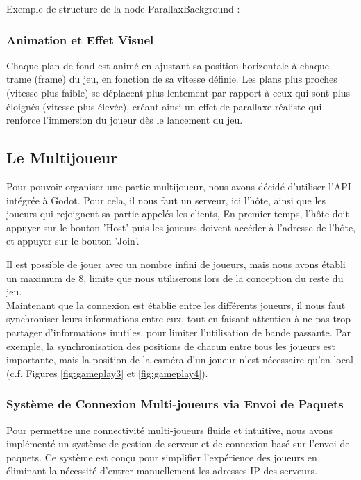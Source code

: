       Exemple de structure de la node ParallaxBackground : %

      \subsubsection*{Animation et Effet Visuel}
      Chaque plan de fond est animé en ajustant sa position horizontale à chaque trame (frame) du jeu, en fonction de sa vitesse définie.
      Les plans plus proches (vitesse plus faible) se déplacent plus lentement par rapport à ceux qui sont plus éloignés (vitesse plus élevée), 
      créant ainsi un effet de parallaxe réaliste qui renforce l'immersion du joueur dès le lancement du jeu.
      \\
      \subsection{Le Multijoueur}

      Pour pouvoir organiser une partie multijoueur, nous avons décidé d'utiliser l'API intégrée à Godot.
      Pour cela, il nous faut un serveur, ici l'hôte, ainsi que les joueurs qui rejoignent sa partie appelés les clients,
      En premier temps, l'hôte doit appuyer sur le bouton 'Host' puis les joueurs doivent accéder à l'adresse de l'hôte, et appuyer sur le bouton 'Join'.

      Il est possible de jouer avec un nombre infini de joueurs, mais nous avons établi un maximum de 8, limite que nous utiliserons lors de la conception du reste du jeu.
      \\

      Maintenant que la connexion est établie entre les différents joueurs, il nous faut synchroniser leurs informations entre eux, 
      tout en faisant attention à ne pas trop partager d'informations inutiles, pour limiter l'utilisation de bande passante.
      Par exemple, la synchronisation des positions de chacun entre tous les joueurs est importante, 
      mais la position de la caméra d'un joueur n'est nécessaire qu'en local (c.f. Figures \ref*{fig:gameplay3} et \ref*{fig:gameplay4}).


      \subsubsection*{Système de Connexion Multi-joueurs via Envoi de Paquets}
      Pour permettre une connectivité multi-joueurs fluide et intuitive, nous avons implémenté un système de gestion de serveur 
      et de connexion basé sur l'envoi de paquets. Ce système est conçu pour simplifier l'expérience des joueurs en éliminant 
      la nécessité d'entrer manuellement les adresses IP des serveurs.

